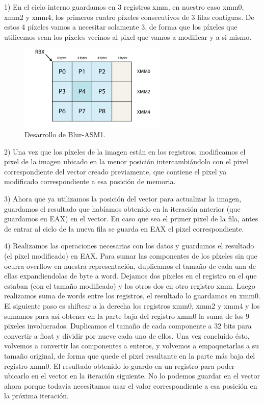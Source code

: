 1) En el ciclo interno guardamos en 3 registros xmm, en nuestro caso xmm0, xmm2 y xmm4, los primeros cuatro píxeles consecutivos de 3 filas contiguas. De estos 4 píxeles vamos a necesitar solamente 3, de forma que los píxeles que utilicemos sean los píxeles vecinos al pixel que vamos a modificar y a si mismo.

\begin{figure}[ht!]
\centering
\includegraphics[width=70mm]{imagenes/blur/blur1-figura2.png}
\caption{Desarrollo de Blur-ASM1.}
\end{figure}

2) Una vez que los píxeles de la imagen están en los registros, modificamos el pixel de la imagen ubicado en la menor posición intercambiándolo con el pixel correspondiente del vector creado previamente, que contiene el pixel ya modificado correspondiente a esa posición de memoria.

3) Ahora que ya utilizamos la posición del vector para actualizar la imagen, guardamos el resultado que habíamos obtenido en la iteración anterior (que guardamos en EAX) en el vector. En caso que sea el primer pixel de la fila, antes de entrar al ciclo de la nueva fila se guarda en EAX el pixel correspondiente.

4) Realizamos las operaciones necesarias con los datos y guardamos el resultado (el pixel modificado) en EAX.
Para sumar las componentes de los píxeles sin que ocurra overflow en nuestra representación, duplicamos el tamaño de cada una de ellas expandiendolas de byte a word. Dejamos dos píxeles en el registro en el que estaban (con el tamaño modificado) y los otros dos en otro registro xmm. 
Luego realizamos suma de words entre los registros, el resultado lo guardamos en xmm0. 
El siguiente paso es  shiftear a la derecha los registros xmm0, xmm2 y xmm4 y los sumamos para asi obtener en la parte baja del registro xmm0 la suma de los 9 pixeles involucrados.
Duplicamos el tamaño de cada componente a 32 bits para convertir a float y dividir por nueve cada uno de ellos. Una vez concluído ésto, volvemos a convertir las componentes a enteros, y volvemos a empaquetarlas a su tamaño original, de forma que quede el pixel resultante en la parte más baja del registro xmm0.
El resultado obtenido lo guardo en un registro para poder ubicarlo en el vector en la iteración siguiente. No lo podemos guardar en el vector ahora porque todavía necesitamos usar el valor correspondiente a esa posición en la próxima iteración.

